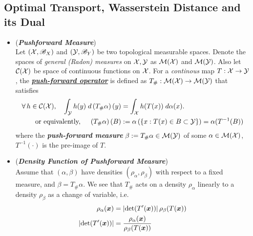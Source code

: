 \documentclass[11pt]{article}
\begin{document}
\subsection{Optimal Transport, Wasserstein Distance and its Dual}
\begin{itemize}
\item \begin{definition} (\textbf{\emph{Pushforward Measure}})  \citep{gabriel2019computational} \\
Let $({\mathcal X}, {\mathscr B}_X)$ and $({\mathcal Y}, {\mathscr B}_Y)$ be two topological measurable spaces.  Denote the spaces of  \emph{general (Radon) measures} on ${\mathcal X}, {\mathcal Y}$  as ${\mathcal M}({\mathcal X})$ and ${\mathcal M}({\mathcal Y})$. Also let  ${\mathcal C}({\mathcal X})$ be space of continuous functions on ${\mathcal X}$. For a \emph{continous} map $T : {\mathcal X} \rightarrow {\mathcal Y}$,  the \underline{\textbf{\emph{push-forward operator}}} is defined as $T_{\#}: {\mathcal M}({\mathcal X}) \rightarrow {\mathcal M}({\mathcal Y})$ that  satisfies 
\begin{align}
\forall\, h\in {\mathcal C}({\mathcal X}), \quad \int_{{\mathcal Y}}h(y)\; d \left(T_{\#}\alpha\right)(y) &= \int_{{\mathcal X}}h(T(x))\; d\alpha(x). \label{eqn: def_push_forward_opt}\\
\text{or equivalently, } \quad \left(T_{\#}\alpha\right)(B)&:= \alpha\left(\left\{x: T(x) \in B \subset {\mathcal Y} \right\}\right) = \alpha(T^{-1}(B))  \label{eqn: def_push_forward_opt2}
\end{align} where the \textbf{\emph{push-forward measure}} $\beta := T_{\#}\alpha \in {\mathcal M}({\mathcal Y})$ of some $\alpha \in  {\mathcal M}({\mathcal X})$, $T^{-1}(\cdot)$ is the pre-image of $T$.
\end{definition}

\item \begin{remark} (\textbf{\emph{Density Function of Pushforward Measure}})\\
Assume that $(\alpha, \beta)$ have densities $(\rho_{\alpha}, \rho_{\beta})$ with respect to a fixed measure, and $\beta = T_{\#}\alpha$. We see that $T_{\#}$ acts on a density $\rho_{\alpha}$ linearly to a density $\rho_{\beta}$ as a change of variable, i.e. 
\begin{align}
\rho_{\alpha}(\boldsymbol{x}) &= \left\lvert \det(T'(\boldsymbol{x})) \right\rvert\rho_{\beta}(T(\boldsymbol{x}))  \label{eqn: density of push-forward distribution}\\
\left\lvert \det(T'(\boldsymbol{x})) \right\rvert &= \frac{\rho_{\alpha}(\boldsymbol{x}) }{\rho_{\beta}(T(\boldsymbol{x})) } \nonumber
\end{align}
\end{remark}



\end{itemize}
\end{document}
